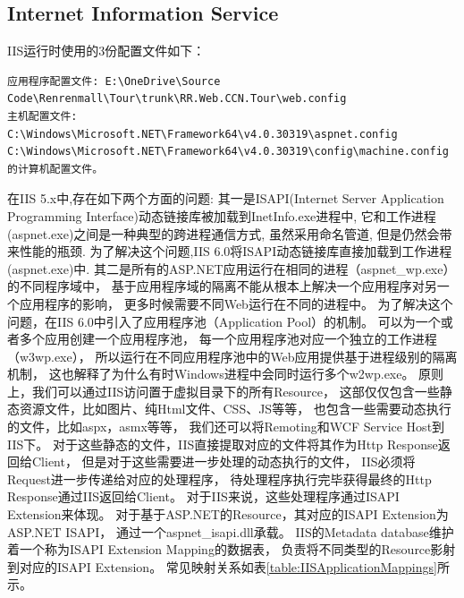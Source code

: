\documentclass{book}
\begin{document}
\subsection{Internet Information Service}

IIS运行时使用的3份配置文件如下：

\begin{lstlisting}
应用程序配置文件: E:\OneDrive\Source Code\Renrenmall\Tour\trunk\RR.Web.CCN.Tour\web.config
主机配置文件: C:\Windows\Microsoft.NET\Framework64\v4.0.30319\aspnet.config
C:\Windows\Microsoft.NET\Framework64\v4.0.30319\config\machine.config 的计算机配置文件。
\end{lstlisting}

在IIS 5.x中,存在如下两个方面的问题:
其一是ISAPI(Internet Server Application Programming Interface)动态链接库被加载到InetInfo.exe进程中,
它和工作进程(aspnet.exe)之间是一种典型的跨进程通信方式,
虽然采用命名管道,
但是仍然会带来性能的瓶颈.
为了解决这个问题,IIS 6.0将ISAPI动态链接库直接加载到工作进程(aspnet.exe)中.
其二是所有的ASP.NET应用运行在相同的进程（aspnet\_wp.exe）的不同程序域中，
基于应用程序域的隔离不能从根本上解决一个应用程序对另一个应用程序的影响，
更多时候需要不同Web运行在不同的进程中。
为了解决这个问题，在IIS 6.0中引入了应用程序池（Application Pool）的机制。
可以为一个或者多个应用创建一个应用程序池，
每一个应用程序池对应一个独立的工作进程（w3wp.exe），
所以运行在不同应用程序池中的Web应用提供基于进程级别的隔离机制\cite{蒋金楠MVC框架揭秘}，
这也解释了为什么有时Windows进程中会同时运行多个w2wp.exe。
原则上，我们可以通过IIS访问置于虚拟目录下的所有Resource，
这部仅仅包含一些静态资源文件，比如图片、纯Html文件、CSS、JS等等，
也包含一些需要动态执行的文件，比如aspx，asmx等等，
我们还可以将Remoting和WCF Service Host到IIS下。
对于这些静态的文件，IIS直接提取对应的文件将其作为Http Response返回给Client，
但是对于这些需要进一步处理的动态执行的文件，
IIS必须将Request进一步传递给对应的处理程序，
待处理程序执行完毕获得最终的Http Response通过IIS返回给Client。
对于IIS来说，这些处理程序通过ISAPI Extension来体现。
对于基于ASP.NET的Resource，其对应的ISAPI Extension为ASP.NET ISAPI，
通过一个aspnet\_isapi.dll承载。
IIS的Metadata database维护着一个称为ISAPI Extension Mapping的数据表，
负责将不同类型的Resource影射到对应的ISAPI Extension。
常见映射关系如表\ref{table:IISApplicationMappings}所示。
\end{document}
